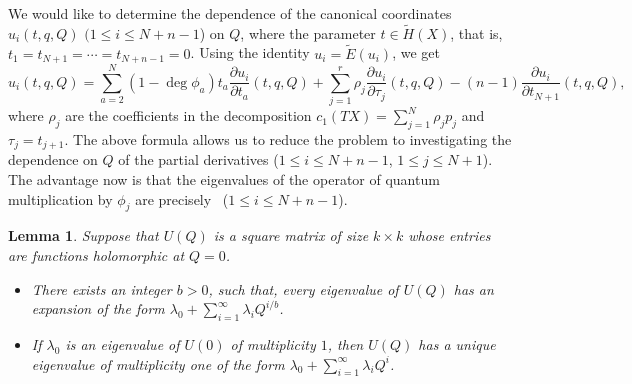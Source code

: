 \documentclass[10pt,a4paper]{article}
\numberwithin{equation}{section}
\newtheorem{Lemma}[Theorem]{Lemma}
\newcommand{\op}{\operatorname}
\begin{document}
We would like to determine the dependence of the canonical coordinates $u_i(t,q,Q)$ $(1\leq i\leq N+n-1$) on $Q$, where the parameter $t\in \widetilde{H}(X)$, that is, $t_1=t_{N+1}=\cdots= t_{N+n-1}=0$. Using the identity $u_i=\widetilde{E}(u_i)$, we get
\[%
u_i(t,q,Q)=
\sum_{a=2}^N (1-\op{deg}\phi_a)t_a
\frac{\partial u_i}{\partial t_a}(t,q,Q)+
\sum_{j=1}^r \rho_j
\frac{\partial u_i}{\partial \tau_j}(t,q,Q)-
(n-1)\frac{\partial u_i}{\partial t_{N+1}}(t,q,Q),
\]
where $\rho_j$ are the coefficients in the decomposition $c_1(TX)=\sum_{j=1}^N \rho_j p_j$ and $\tau_j=t_{j+1}$.
The above formula allows us to reduce the problem to investigating the dependence on $Q$ of the partial derivatives  ($1\leq i\leq N+n-1$, $1\leq j\leq N+1$). The advantage now is that the eigenvalues of the operator  of quantum multiplication by $\phi_j$ are precisely~ ($1\leq i\leq N+n-1$).
\begin{Lemma}\label{le:eig_Q}
Suppose that $U(Q)$ is a square matrix of size $k\times k$ whose entries are functions holomorphic at $Q=0$.
\begin{itemize}\itemsep=0pt
\item[$(a)$] There exists an integer $b>0$, such that, every eigenvalue of
$U(Q)$ has an expansion of the form $\lambda_0+\sum_{i=1}^\infty \lambda_i Q^{i/b}$.
\item[$(b)$] If $\lambda_0$ is an eigenvalue of $U(0)$ of multiplicity $1$, then $U(Q)$ has a unique eigenvalue of multiplicity one of the form $\lambda_0+\sum_{i=1}^\infty \lambda_i Q^i$.
 \end{itemize}
\end{Lemma}
\end{document}
